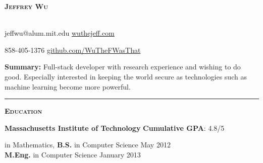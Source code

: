 \documentclass[11 pt]{article}
\begin{document}
\begin{center}
\begin{LARGE}\textsc{\textbf{Jeffrey Wu}}\end{LARGE} \\
jeffwu@alum.mit.edu \hfill \href{http://wuthejeff.com}{wuthejeff.com}

858-405-1376  \hfill \href{https://github.com/WuTheFWasThat}{github.com/WuTheFWasThat}\\
\end{center}

\noindent \textbf{Summary:} Full-stack developer with research experience and wishing to do good.
Especially interested in keeping the world secure as technologies such as machine learning become more powerful. \\





\hrule

\begin{center}\begin{Large}\textsc{\textbf{Education}\\}\end{Large}
\end{center}

\noindent \textbf{Massachusetts Institute of Technology} \hfill \textbf{Cumulative GPA}: 4.8/5 \\
\begin{small}
 in Mathematics, {\bf B.S.} in Computer Science \hfill May 2012 \\
{\bf M.Eng.} in Computer Science \hfill January 2013 \\
\end{small}
\end{document}
